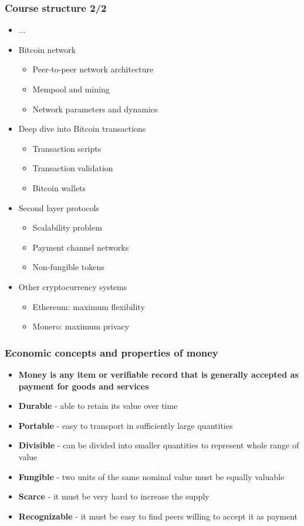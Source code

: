 \documentclass{beamer}
\begin{document}
\begin{frame}
  \frametitle{Course structure 2/2}
  \begin{itemize}
  \item[] ...
  \item Bitcoin network
    \begin{itemize}
    \item Peer-to-peer network architecture
    \item Mempool and mining
    \item Network parameters and dynamics
    \end{itemize}
  \item Deep dive into Bitcoin transactions
    \begin{itemize}
    \item Transaction scripts
    \item Transaction validation
    \item Bitcoin wallets
    \end{itemize}
  \item Second layer protocols
    \begin{itemize}
    \item Scalability problem
    \item Payment channel networks
    \item Non-fungible tokens
    \end{itemize}
  \item Other cryptocurrency systems
    \begin{itemize}
    \item Ethereum: maximum flexibility
    \item Monero: maximum privacy
    \end{itemize}
  \end{itemize}
\end{frame}

\begin{frame}
  \frametitle{Economic concepts and properties of money}
  \begin{itemize}
  \item \textbf{Money is any item or verifiable record that is generally accepted as
    payment for goods and services}
  \item \textbf{Durable} - able to retain its value over time
  \item \textbf{Portable} - easy to transport in sufficiently large quantities
  \item \textbf{Divisible} - can be divided into smaller quantities to represent whole
    range of value
  \item \textbf{Fungible} - two units of the same nominal value must be equally valuable
  \item \textbf{Scarce} - it must be very hard to increase the supply
  \item \textbf{Recognizable} - it must be easy to find peers willing to accept
    it as payment
  \end{itemize}
\end{frame}
\end{document}
